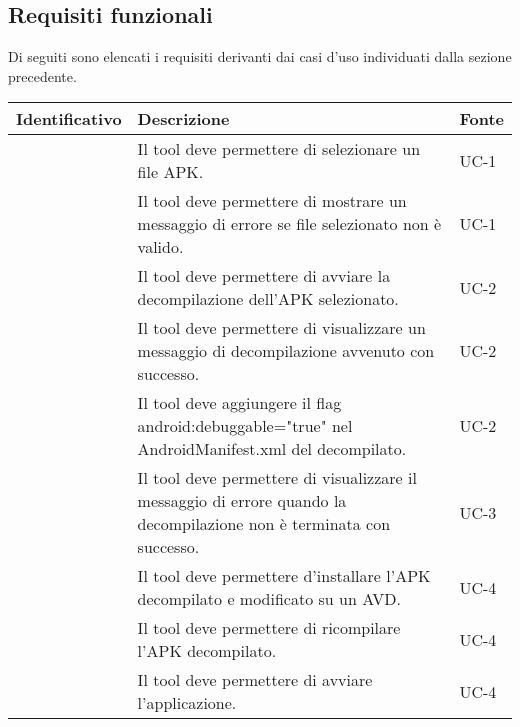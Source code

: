 \subsection{Requisiti funzionali}\label{subsec:requisiti-funzionali}
Di seguiti sono elencati i requisiti derivanti dai casi d'uso individuati dalla sezione precedente.
\begin{longtable}{ | c| C{7cm} |C{3cm} |}
    \hline
    \textbf{Identificativo} & \textbf{Descrizione}                                                                                                  & \textbf{Fonte} \\\hline
           & Il tool deve permettere di selezionare un file APK.                                                                   & UC-1           \\\hline
        & Il tool deve permettere di mostrare un messaggio di errore se file selezionato non è valido.                          & UC-1           \\\hline
    \setcounter{subCount}{0}

           & Il tool deve permettere di avviare la decompilazione dell'APK selezionato.                                            & UC-2           \\\hline
        & Il tool deve permettere di visualizzare un messaggio di decompilazione avvenuto con successo.                         & UC-2           \\\hline
        & Il tool deve aggiungere il flag android:debuggable="true" nel AndroidManifest.xml del decompilato.                    & UC-2           \\\hline
    \setcounter{subCount}{0}

           & Il tool deve permettere di visualizzare il messaggio di errore quando la decompilazione non è terminata con successo. & UC-3           \\\hline
           & Il tool deve permettere d'installare l'APK decompilato e modificato su un AVD.                                         & UC-4           \\\hline
        & Il tool deve permettere di ricompilare l'APK decompilato.                                                             & UC-4           \\\hline
        & Il tool deve permettere di avviare l'applicazione.                                                                    & UC-4           \\\hline


\end{longtable}
